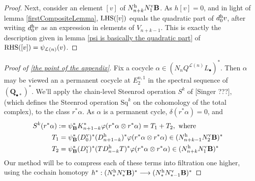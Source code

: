 \documentclass[11pt]{amsart}
\theoremstyle{plain}
\theoremstyle{definition}
\let\oldphi\phi
\let\phi\varphi
\renewcommand{\to}{\longrightarrow}
\newcommand{\calL}{\mathcal{L}}
\theoremstyle{plain}
\newcommand{\Sq}{\mathrm{Sq}}
\begin{document}
\begin{appendices}
\begin{proof}
Next, consider an element $[v]$ of $N_{n+k}^\textup{h}N_1^\textup{v}\textbf{B}$. As $h[v]=0$, and in light of lemma \ref{firstCompositeLemma}, $\textup{LHS}([v])$ equals the quadratic part of $d_0^\textup{h}v$, after writing $d_0^\textup{h}v$ as an expression in elements of $V_{n+k-1}$. This is exactly the description given in lemma \ref{psi is basically the quadratic part} of $\textup{RHS}([v])=\psi_{\calL(n)}(v)$.
\end{proof}
\begin{proof}[Proof of \ref{the point of the appendix}]
Fix a cocycle $\alpha\in (N_{n}Q^{\calL(n)} L_\bullet)^*$. %
Then $\alpha$ may be viewed an a permanent cocycle at $E_2^{n,1}$ in the spectral sequence of $(\textbf{Q}_{\bullet*})^*$. We'll apply the chain-level Steenrod operation $S^k$ of [Singer ???], (which defines the Steenrod operation $\Sq^k$ on the cohomology of the total complex), to the class $r^*\alpha$. As $\alpha$ is a permanent cycle, $\delta(r^*\alpha)=0$, and
\begin{alignat*}{2}
S^k(r^*\alpha):={}&\psi_{\textup{\textbf{B}}}^*K^*_{n+1-k}\oldphi(r^*\alpha\otimes r^*\alpha)=T_1+T_2,\textup{ where}
\\
T_1
={}&
\psi_{\textup{\textbf{B}}}^*(D^\textup{v}_0)^*(D^\textup{h}_{n+1-k})^*
\oldphi(r^*\alpha\otimes r^*\alpha)\in (N^\textup{h}_{n+k-1}N^\textup{v}_2\textbf{B})^*%
\\
T_2
={}&
\psi_{\textup{\textbf{B}}}^*(D^\textup{v}_1)^*(TD^\textup{h}_{n-k}T)^*
\oldphi(r^*\alpha\otimes r^*\alpha)\in (N^\textup{h}_{n+k}N^\textup{v}_1\textbf{B})^*
\end{alignat*}
%
Our method will be to compress each of these terms into filtration one higher, using the cochain homotopy $h^*:(N^\textup{h}_* N^\textup{v}_*\textbf{B})^*\to (N^\textup{h}_*N^\textup{v}_{*-1}\textbf{B})^*$

\end{proof}
\end{appendices}
\end{document}
